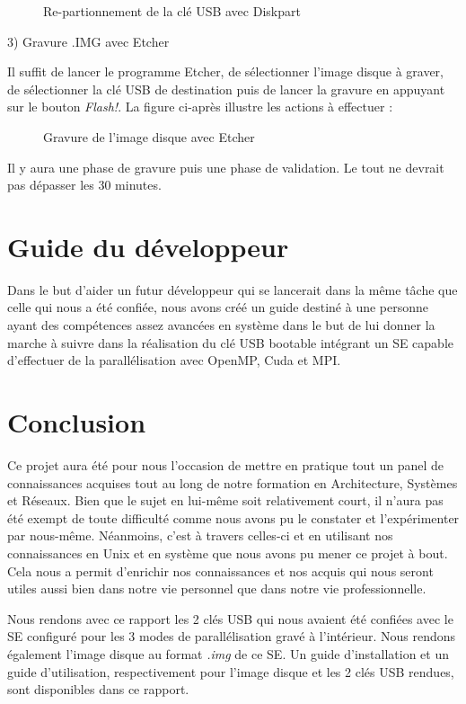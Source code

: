 \documentclass[final]{polytech/polytech}
\begin{document}
\begin{figure}
	\caption{Re-partionnement de la clé USB avec Diskpart}
	\label{fig:partion}
\end{figure}

\vfill\eject

3) Gravure .IMG avec Etcher

Il suffit de lancer le programme Etcher, de sélectionner l'image disque à graver, de sélectionner la clé USB de destination puis de lancer la gravure en appuyant sur le bouton \textit{Flash!}. La figure ci-après illustre les actions à effectuer :

\vfill\eject

\begin{figure}
	\caption{Gravure de l'image disque avec Etcher}
	\label{fig:etcher_mount}
\end{figure}

Il y aura une phase de gravure puis une phase de validation. Le tout ne devrait pas dépasser les 30 minutes.

\part{Guide du développeur} %
Dans le but d'aider un futur développeur qui se lancerait dans la même tâche que celle qui nous a été confiée, nous avons créé un guide destiné à une personne ayant des compétences assez avancées en système dans le but de lui donner la marche à suivre dans la réalisation du clé USB bootable intégrant un SE capable d'effectuer de la parallélisation avec OpenMP, Cuda et MPI.

\part{Conclusion}

Ce projet aura été pour nous l’occasion de mettre en pratique tout un panel de connaissances acquises tout au long de notre formation en Architecture, Systèmes et Réseaux. Bien que le sujet en lui-même soit relativement court, il n’aura pas été exempt de toute difficulté comme nous avons pu le constater et l’expérimenter par nous-même. Néanmoins, c’est à travers celles-ci et en utilisant nos connaissances en Unix et en système que nous avons pu mener ce projet à bout. Cela nous a permit d'enrichir nos connaissances et nos acquis qui nous seront utiles aussi bien dans notre vie personnel que dans notre vie professionnelle.

Nous rendons avec ce rapport les 2 clés USB qui nous avaient été confiées avec le SE configuré pour les 3 modes de parallélisation gravé à l'intérieur. Nous rendons également l'image disque au format \textit{.img} de ce SE. Un guide d'installation et un guide d'utilisation, respectivement pour l'image disque et les 2 clés USB rendues, sont disponibles dans ce rapport.
\end{document}
